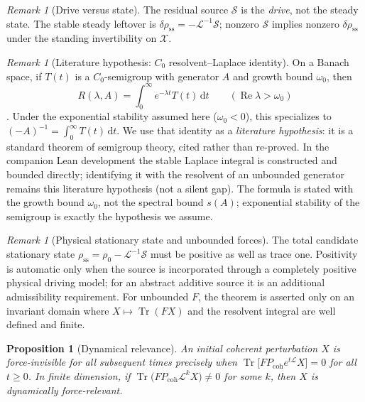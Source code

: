 \documentclass[11pt]{article}
\newtheorem{proposition}[theorem]{Proposition}
\theoremstyle{definition}
\theoremstyle{remark}
\newtheorem{remark}[theorem]{Remark}
\newcommand{\dd}{\mathrm{d}}
\newcommand{\Tr}{\operatorname{Tr}}
\begin{document}
\begin{remark}[Drive versus state]
\label{rem:S-not-state}
The residual source $\mathcal S$ is the \emph{drive}, not the steady state.
The stable steady leftover is $\delta\rho_{\mathrm{ss}}=-\mathcal L^{-1}\mathcal S$; nonzero $\mathcal S$ implies nonzero $\delta\rho_{\mathrm{ss}}$ under the standing invertibility on $\mathcal X$.
\end{remark}

\begin{remark}[Literature hypothesis: $C_0$ resolvent--Laplace identity]
\label{rem:lit-resolvent}
On a Banach space, if $T(t)$ is a $C_0$-semigroup with generator $A$ and growth bound $\omega_0$, then
\begin{equation}
  R(\lambda,A)=\int_0^\infty e^{-\lambda t}T(t)\,\dd t
  \qquad(\operatorname{Re}\lambda>\omega_0)
\end{equation}
\cite{pazy1983,engelNagel2000}.
Under the exponential stability assumed here ($\omega_0<0$), this specializes to
$(-A)^{-1}=\int_0^\infty T(t)\,\dd t$.
We use that identity as a \emph{literature hypothesis}: it is a standard theorem of semigroup theory, cited rather than re-proved.
In the companion Lean development the stable Laplace integral is constructed and bounded directly; identifying it with the resolvent of an unbounded generator remains this literature hypothesis (not a silent gap).
The formula is stated with the growth bound $\omega_0$, not the spectral bound $s(A)$; exponential stability of the semigroup is exactly the hypothesis we assume.
\end{remark}

\begin{remark}[Physical stationary state and unbounded forces]
The total candidate stationary state $\rho_{\mathrm{ss}}=\rho_0-\mathcal L^{-1}\mathcal S$ must be positive as well as trace one.
Positivity is automatic only when the source is incorporated through a completely positive physical driving model; for an abstract additive source it is an additional admissibility requirement.
For unbounded $F$, the theorem is asserted only on an invariant domain where $X\mapsto\Tr(FX)$ and the resolvent integral are well defined and finite.
\end{remark}

\begin{proposition}[Dynamical relevance]
An initial coherent perturbation $X$ is force-invisible for all subsequent times precisely when
$\Tr\bigl[F P_{\mathrm{coh}} e^{t\mathcal L}X\bigr]=0$ for all $t\ge 0$.
In finite dimension, if $\Tr\bigl(F P_{\mathrm{coh}}\mathcal L^k X\bigr)\ne 0$ for some $k$, then $X$ is dynamically force-relevant.
\end{proposition}
\end{document}
